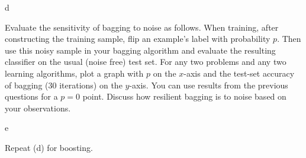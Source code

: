 \documentclass[fleqn]{homework}
\begin{document}
  \begin{problem}{d}
    \begin{question}
      Evaluate the sensitivity of bagging to noise as follows. When training,
      after constructing the training sample, flip an example’s label with
      probability $p$. Then use this noisy sample in your bagging algorithm and
      evaluate the resulting classifier on the usual (noise free) test set. For
      any two problems and any two learning algorithms, plot a graph with $p$ on
      the $x$-axis and the test-set accuracy of bagging (30 iterations) on the
      $y$-axis. You can use results from the previous questions for a $p=0$
      point. Discuss how resilient bagging is to noise based on your
      observations.
    \end{question}
  \end{problem}

  \begin{problem}{e}
    \begin{question}
      Repeat (d) for boosting.
    \end{question}
  \end{problem}
\end{document}
